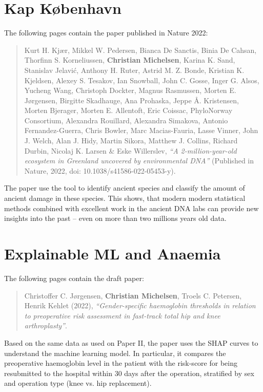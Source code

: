 
\chapter{Kap København}
\label{appendix:kapk}

The following pages contain the paper published in Nature 2022:

\begin{quote}
    Kurt H. Kjær, Mikkel W. Pedersen, Bianca De Sanctis, Binia De Cahsan, Thorfinn S. Korneliussen, \textbf{Christian Michelsen}, Karina K. Sand, Stanislav Jelavić, Anthony H. Ruter, Astrid M. Z. Bonde, Kristian K. Kjeldsen, Alexey S. Tesakov, Ian Snowball, John C. Gosse, Inger G. Alsos, Yucheng Wang, Christoph Dockter, Magnus Rasmussen, Morten E. Jørgensen, Birgitte Skadhauge, Ana Prohaska, Jeppe Å. Kristensen, Morten Bjerager, Morten E. Allentoft, Eric Coissac, PhyloNorway Consortium, Alexandra Rouillard, Alexandra Simakova, Antonio Fernandez-Guerra, Chris Bowler, Marc Macias-Fauria, Lasse Vinner, John J. Welch, Alan J. Hidy, Martin Sikora, Matthew J. Collins, Richard Durbin, Nicolaj K. Larsen \& Eske Willerslev, \emph{``A 2-million-year-old ecosystem in Greenland uncovered by environmental DNA''} (Published in Nature, 2022, doi: 10.1038/s41586-022-05453-y).
\end{quote}
The paper use the \metaDMG tool to identify ancient species and classify the amount of ancient damage in these species.  This shows, that modern modern statistical methods combined with excellent work in the ancient DNA labs can provide new insights into the past -- even on more than two millions years old data.

\clearpage




\chapter{Explainable ML and Anaemia}
\label{appendix:anaemia}

The following pages contain the draft paper:

\begin{quote}
    Christoffer C. Jørgensen, \textbf{Christian Michelsen}, Troels C. Petersen, Henrik Kehlet (2022), \emph{``Gender-specific haemoglobin thresholds in relation to preoperative risk assessment in fast-track total hip and knee arthroplasty''}.
\end{quote}
Based on the same data as used on Paper II, the paper uses the SHAP curves to understand the machine learning model. In particular, it compares the preoperative haemoglobin level in the patient with the risk-score for being resubmitted to the hospital within 30 days after the operation, stratified by sex and operation type (knee vs. hip replacement).
\clearpage



